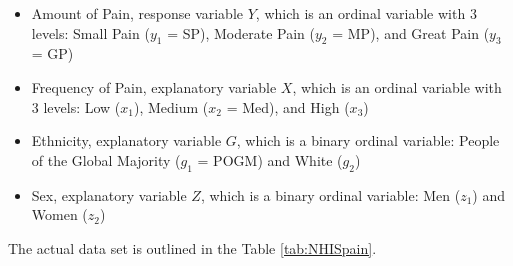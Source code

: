 \documentclass[
]{article}
\providecommand{\tightlist}{%
  \setlength{\itemsep}{0pt}\setlength{\parskip}{0pt}}
\begin{document}
\begin{itemize}
\tightlist
\item
  Amount of Pain, response variable \(Y\), which is an ordinal variable
  with 3 levels: Small Pain (\(y_1\) = SP), Moderate Pain (\(y_2\) =
  MP), and Great Pain (\(y_3\) = GP)
\item
  Frequency of Pain, explanatory variable \(X\), which is an ordinal
  variable with 3 levels: Low (\(x_1\)), Medium (\(x_2\) = Med), and
  High (\(x_3\))
\item
  Ethnicity, explanatory variable \(G\), which is a binary ordinal
  variable: People of the Global Majority (\(g_1\) = POGM) and White
  (\(g_2\))
\item
  Sex, explanatory variable \(Z\), which is a binary ordinal variable:
  Men (\(z_1\)) and Women (\(z_2\))
\end{itemize}

The actual data set is outlined in the Table \ref{tab:NHISpain}.
\end{document}

